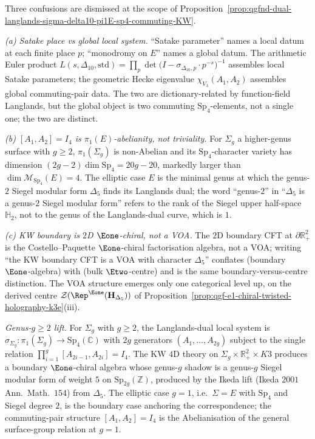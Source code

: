 \begin{remark}[Three dismissals and the genus-\texorpdfstring{$g\geq 2$}{g>= 2} lift]
\label{rem:qgfnd-sigma-pi1E-dismissals-higher-genus-KW}
Three confusions are dismissed at the scope of
Proposition~\ref{prop:qgfnd-dual-langlands-sigma-delta10-pi1E-sp4-commuting-KW}.

\emph{(a) Satake place vs global local system.} ``Satake parameter''
names a local datum at each finite place $p$; ``monodromy on $E$''
names a global datum. The arithmetic Euler product
$L(s,\Delta_{10},\mathrm{std})=\prod_p\det\!\bigl(I-\sigma_{\Delta_{10},p}\cdot
p^{-s}\bigr)^{-1}$ assembles local Satake parameters; the geometric
Hecke eigenvalue $\chi_{V_\lambda}(A_1,A_2)$ assembles global
commuting-pair data. The two are dictionary-related by
function-field Langlands, but the global object is two commuting
$\mathrm{Sp}_4$-elements, not a single one; the two are distinct.

\emph{(b) $[A_1,A_2]=I_4$ is $\pi_1(E)$-abelianity, not triviality.}
For $\Sigma_g$ a higher-genus surface with $g\geq 2$,
$\pi_1(\Sigma_g)$ is non-Abelian and its $\mathrm{Sp}_4$-character
variety has dimension $(2g-2)\dim\mathrm{Sp}_4=20g-20$, markedly
larger than $\dim\mathcal M_{\mathrm{Sp}_4}(E)=4$. The elliptic case
$E$ is the minimal genus at which the genus-$2$ Siegel modular form
$\Delta_5$ finds its Langlands dual; the word ``genus-$2$'' in
``$\Delta_5$ is a genus-$2$ Siegel modular form'' refers to the rank
of the Siegel upper half-space $\mathbb H_2$, not to the genus of
the Langlands-dual curve, which is $1$.

\emph{(c) KW boundary is $2$D $\Eone$-chiral, not a VOA.} The $2$D
boundary CFT at $\partial\mathbb R_+^2$ is the Costello--Paquette
$\Eone$-chiral factorisation algebra, not a VOA; writing ``the KW
boundary CFT is a VOA with character $\Delta_5$'' conflates
(boundary $\Eone$-algebra) with (bulk $\Etwo$-centre) and is the
same boundary-versus-centre distinction. The VOA structure emerges
only one categorical level up,
on the derived centre
$\mathcal Z(\Rep^{\Eone}(\mathbf H_{\Delta_5}))$ of
Proposition~\ref{prop:qgf-e1-chiral-twisted-holography-k3e}(iii).

\emph{Genus-$g\geq 2$ lift.} For $\Sigma_g$ with $g\geq 2$, the
Langlands-dual local system is
$\sigma_{\Sigma_g}\colon\pi_1(\Sigma_g)\to\mathrm{Sp}_4(\mathbb C)$
with $2g$ generators $(A_1,\ldots,A_{2g})$ subject to the single
relation $\prod_{i=1}^g[A_{2i-1},A_{2i}]=I_4$. The KW $4$D theory
on $\Sigma_g\times\mathbb R_+^2\times K3$ produces a boundary
$\Eone$-chiral algebra whose genus-$g$ shadow is a
genus-$g$ Siegel modular form of weight $5$ on
$\mathrm{Sp}_{2g}(\mathbb Z)$, produced by the Ikeda lift
(Ikeda $2001$ Ann.\ Math.\ $154$) from $\Delta_5$. The elliptic case
$g=1$, i.e.\ $\Sigma=E$ with $\mathrm{Sp}_4$ and Siegel degree $2$,
is the boundary case anchoring the correspondence; the commuting-pair
structure $[A_1,A_2]=I_4$ is the Abelianisation of the general
surface-group relation at $g=1$.
\end{remark}

